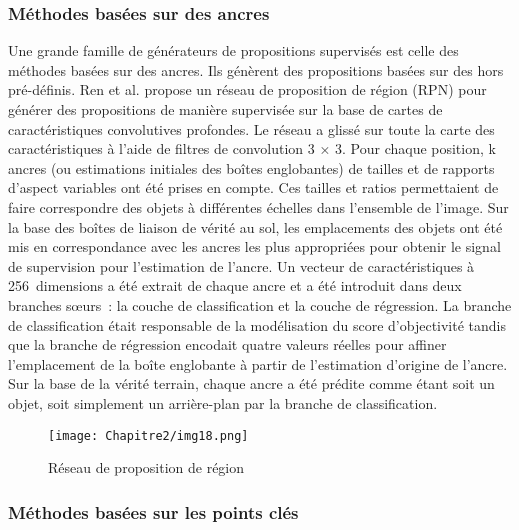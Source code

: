           \subsubsection{Méthodes basées sur des ancres}
          Une grande famille de générateurs de propositions supervisés est celle des méthodes basées sur des ancres. Ils génèrent des propositions basées sur des hors pré-définis. Ren et al. propose un réseau de proposition de région (RPN) \cite{rcnn_paper} pour générer des propositions de manière supervisée sur la base de cartes de caractéristiques convolutives profondes. Le réseau a glissé sur toute la carte des caractéristiques à l'aide de filtres de convolution 3 × 3. Pour chaque position, k ancres (ou estimations initiales des boîtes englobantes) de tailles et de rapports d'aspect variables ont été prises en compte. Ces tailles et ratios permettaient de faire correspondre des objets à différentes échelles dans l'ensemble de l'image. Sur la base des boîtes de liaison de vérité au sol, les emplacements des objets ont été mis en correspondance avec les ancres les plus appropriées pour obtenir le signal de supervision pour l'estimation de l'ancre. Un vecteur de caractéristiques à 256 dimensions a été extrait de chaque ancre et a été introduit dans deux branches sœurs : la couche de classification et la couche de régression. La branche de classification était responsable de la modélisation du score d'objectivité tandis que la branche de régression encodait quatre valeurs réelles pour affiner l'emplacement de la boîte englobante à partir de l'estimation d'origine de l'ancre. Sur la base de la vérité terrain, chaque ancre a été prédite comme étant soit un objet, soit simplement un arrière-plan par la branche de classification.
          \begin{figure}[H]
               \centering
               \texttt{[image: Chapitre2/img18.png]}
               \caption{Réseau de proposition de région \cite{diagram_rpn_overflow}}
               \label{img18}
               \end{figure}

          \subsubsection{Méthodes basées sur les points clés}
